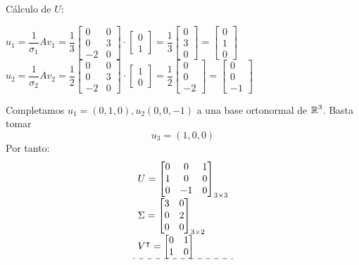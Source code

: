 \begin{enumerate}[label=\color{red}\textbf{\arabic*)}, leftmargin=*]
	Cálculo de $U$:
	
	$u_1=\dfrac{1}{\sigma_1}Av_1=\dfrac{1}{3}\begin{bmatrix}
			0 & 0\\
			0 & 3\\
			-2 & 0
		\end{bmatrix}\cdot\begin{bmatrix}
		0\\
		1
		\end{bmatrix}=\dfrac{1}{3}\begin{bmatrix}
		0\\
		3\\
		0
		\end{bmatrix}=\begin{bmatrix}
		0\\
		1\\
		0
		\end{bmatrix}$\\
		$u_2=\dfrac{1}{\sigma_2}Av_2=\dfrac{1}{2}\begin{bmatrix}
			0 & 0\\
			0 & 3\\
			-2 & 0
		\end{bmatrix}\cdot\begin{bmatrix}
		1\\
		0
		\end{bmatrix}=\dfrac{1}{2}\begin{bmatrix}
		0\\
		0\\
		-2
		\end{bmatrix}=\begin{bmatrix}
		0\\
		0\\
		-1
		\end{bmatrix}$
		
		Completamos $u_1=(0,1,0), u_2(0,0,-1)$ a una base ortonormal de $\operatorname{\mathbb{R}}^3$. Basta tomar \[ u_3=(1,0,0) \]Por tanto:\[\begin{array}{l}
			U=\begin{bmatrix}
				0 & 0 & 1 \\
				1 & 0 & 0 \\
				0 & -1 & 0
			\end{bmatrix}_{3\times3}\\
			\Sigma=\begin{bmatrix}
				3 & 0\\
				0  & 2\\
				0 & 0
			\end{bmatrix}_{3\times2}\\
			V^\intercal=\begin{bmatrix}
				0 & 1\\
				1 & 0
			\end{bmatrix}\\ \hdashline
			

\end{array}\]
\end{enumerate}
